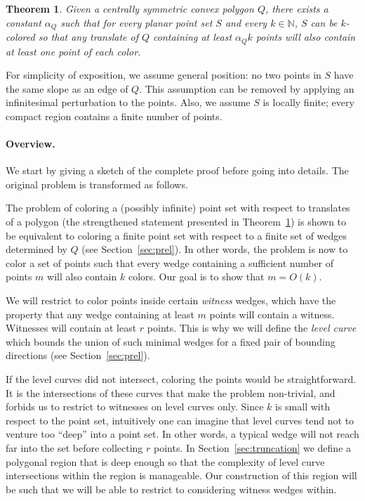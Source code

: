 \documentclass[english,11pt]{article}
\newtheorem{theorem}{Theorem}
\begin{document}
\begin{theorem}
\label{thm:rephrased}
Given a centrally symmetric convex polygon $Q$, there exists a constant $\alpha_Q$ such that for every planar point set $S$ and every $k\in \mathbb N$, 
$S$ can be $k$-colored so that any translate of $Q$ containing at least $\alpha_Q k$ points will also contain at least one point of each color.
\end{theorem}

For simplicity of exposition, we assume general position: no two
points in $S$ have the same slope as an edge of $Q$. This assumption
can be removed by applying an infinitesimal perturbation to the
points. Also, we assume $S$ is locally finite; 
every compact region contains a finite number of points.

\paragraph{Overview.}
We start by giving a sketch of the complete proof before going into details. The original problem is transformed as follows.

The problem of coloring a (possibly infinite) point set with respect to translates of a polygon (the strengthened statement presented in Theorem~\ref{thm:rephrased}) is  shown to be equivalent to coloring a finite point set  with respect to a finite set of wedges determined by $Q$ (see Section~\ref{sec:prel}). 
In other words,  the problem is now to color a set of points such that every wedge containing a sufficient number of  points $m$ will also contain $k$ colors.  Our goal is to show that $m=O(k)$.
 
We will restrict to color points inside certain \emph{witness} wedges, which have the property that any wedge containing at least $m$ points will contain a witness. Witnesses will contain at least $r$ points. This is why we will define the \emph{level curve} which bounds the union of such minimal wedges for a fixed pair of bounding directions  (see Section~\ref{sec:prel}).


If the level curves did not intersect, coloring the points would be straightforward. It is the intersections of these curves that make the problem non-trivial, and forbids us to restrict to witnesses on level curves only.  Since $k$ is small with respect to the point set, intuitively one can imagine that level curves tend not to venture too ``deep'' into a point set.  In other words, a typical wedge will not reach far into the set before collecting $r$ points.
In Section~\ref{sec:truncation} we define a polygonal region that is deep enough so that the complexity of level curve intersections  within the region is manageable.  Our construction of this region will be such that we will be able to restrict to considering witness wedges within.
\end{document}
